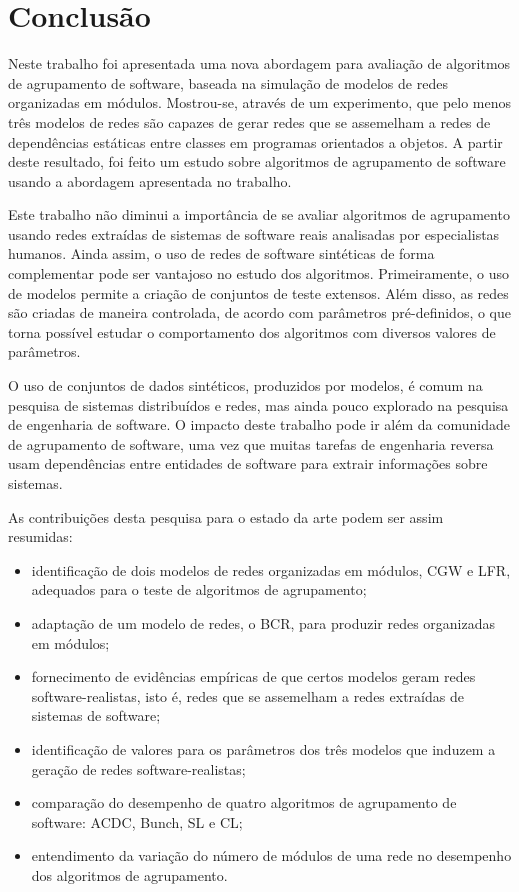 

\chapter{Conclusão} \label{cap:conclusao}

Neste trabalho foi apresentada uma nova abordagem para avaliação de algoritmos de agrupamento de software, baseada na simulação de modelos de redes organizadas em módulos. Mostrou-se, através de um experimento, que pelo menos três modelos de redes são capazes de gerar redes que se assemelham a redes de dependências estáticas entre classes em programas orientados a objetos. A partir deste resultado, foi feito um estudo sobre algoritmos de agrupamento de software usando a abordagem apresentada no trabalho.

Este trabalho não diminui a importância de se avaliar algoritmos de agrupamento usando redes extraídas de sistemas de software reais analisadas por especialistas humanos. Ainda assim, o uso de redes de software sintéticas de forma complementar pode ser vantajoso no estudo dos algoritmos. Primeiramente, o uso de modelos permite a criação de conjuntos de teste extensos. Além disso, as redes são criadas de maneira controlada, de acordo com parâmetros pré-definidos, o que torna possível estudar o comportamento dos algoritmos com diversos valores de parâmetros.

O uso de conjuntos de dados sintéticos, produzidos por modelos, é comum na pesquisa de sistemas distribuídos e redes, mas ainda pouco explorado na pesquisa de engenharia de software. O impacto deste trabalho pode ir além da comunidade de agrupamento de software, uma vez que muitas tarefas de engenharia reversa usam dependências entre entidades de software para extrair informações sobre sistemas.

As contribuições desta pesquisa para o estado da arte podem ser assim resumidas:

\begin{itemize}
	\item identificação de dois modelos de redes organizadas em módulos, CGW e LFR, adequados para o teste de algoritmos de agrupamento;
	\item adaptação de um modelo de redes, o BCR, para produzir redes organizadas em módulos;
	\item fornecimento de evidências empíricas de que certos modelos geram redes software-realistas, isto é, redes que se assemelham a redes extraídas de sistemas de software;
	\item identificação de valores para os parâmetros dos três modelos que induzem a geração de redes software-realistas;
	\item comparação do desempenho de quatro algoritmos de agrupamento de software: ACDC, Bunch, SL e CL;
	\item entendimento da variação do número de módulos de uma rede no desempenho dos algoritmos de agrupamento.
\end{itemize}

